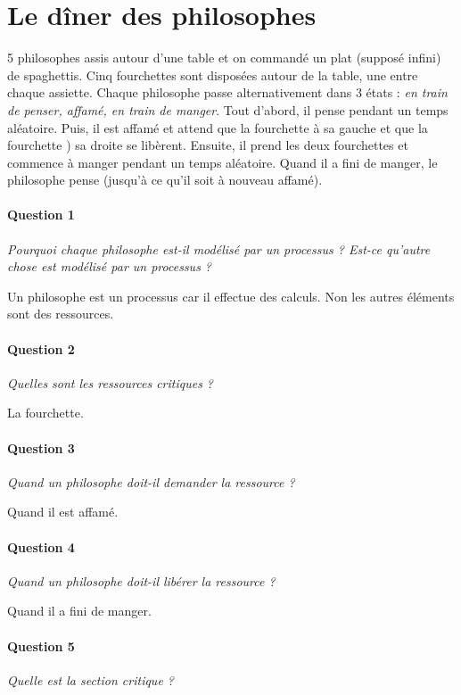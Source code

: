 \documentclass[11pt, a4paper]{article}
\begin{document}
\section{Le dîner des philosophes}

5 philosophes assis autour d'une table et on commandé un plat (supposé infini) de spaghettis. Cinq fourchettes sont disposées autour de la table, une entre chaque assiette. Chaque philosophe passe alternativement dans 3 états : \emph{en train de penser, affamé, en train de manger}. Tout d'abord, il pense pendant un temps aléatoire. Puis, il est affamé et attend que la fourchette à sa gauche et que la fourchette ) sa droite se libèrent. Ensuite, il prend les deux fourchettes et commence à manger pendant un temps aléatoire. Quand il a fini de manger, le philosophe pense (jusqu'à ce qu'il soit à nouveau affamé).

\paragraph{Question 1} \emph{Pourquoi chaque philosophe est-il modélisé par un processus ? Est-ce qu'autre chose est modélisé par un processus ?}

Un philosophe est un processus car il effectue des calculs. Non les autres éléments sont des ressources.

\paragraph{Question 2} \emph{Quelles sont les ressources critiques ?}

La fourchette.

\paragraph{Question 3} \emph{Quand un philosophe doit-il demander la ressource ?}

Quand il est affamé.

\paragraph{Question 4} \emph{Quand un philosophe doit-il libérer la ressource ?}

Quand il a fini de manger.

\paragraph{Question 5} \emph{Quelle est la section critique ?}
\end{document}
